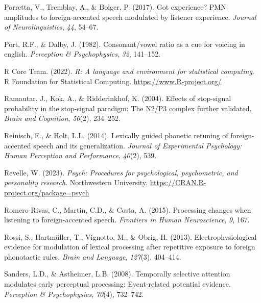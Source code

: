 \documentclass[
  12pt,
  twoside]{article}
\newlength{\cslhangindent}
\newlength{\cslentryspacingunit} %
\newenvironment{CSLReferences}[2] %
 {%
  \setlength{\parindent}{0pt}
  \ifodd #1
  \let\oldpar\par
  \def\par{\hangindent=\cslhangindent\oldpar}
  \fi
  \setlength{\parskip}{#2\cslentryspacingunit}
 }%
 {}
\begin{document}
\begin{CSLReferences}{1}{0}
\leavevmode{}%
Porretta, V., Tremblay, A., \& Bolger, P. (2017). Got experience? PMN amplitudes to foreign-accented speech modulated by listener experience. \emph{Journal of Neurolinguistics}, \emph{44}, 54--67.

\leavevmode{}%
Port, R.F., \& Dalby, J. (1982). Consonant/vowel ratio as a cue for voicing in english. \emph{Perception \& Psychophysics}, \emph{32}, 141--152.

\leavevmode{}%
R Core Team. (2022). \emph{R: A language and environment for statistical computing}. R Foundation for Statistical Computing. \url{https://www.R-project.org/}

\leavevmode{}%
Ramautar, J., Kok, A., \& Ridderinkhof, K. (2004). Effects of stop-signal probability in the stop-signal paradigm: The {N2/P3} complex further validated. \emph{Brain and Cognition}, \emph{56}(2), 234--252.

\leavevmode{}%
Reinisch, E., \& Holt, L.L. (2014). Lexically guided phonetic retuning of foreign-accented speech and its generalization. \emph{Journal of Experimental Psychology: Human Perception and Performance}, \emph{40}(2), 539.

\leavevmode{}%
Revelle, W. (2023). \emph{Psych: Procedures for psychological, psychometric, and personality research}. Northwestern University. \url{https://CRAN.R-project.org/package=psych}

\leavevmode{}%
Romero-Rivas, C., Martin, C.D., \& Costa, A. (2015). Processing changes when listening to foreign-accented speech. \emph{Frontiers in Human Neuroscience}, \emph{9}, 167.

\leavevmode{}%
Rossi, S., Hartmüller, T., Vignotto, M., \& Obrig, H. (2013). Electrophysiological evidence for modulation of lexical processing after repetitive exposure to foreign phonotactic rules. \emph{Brain and Language}, \emph{127}(3), 404--414.

\leavevmode{}%
Sanders, L.D., \& Astheimer, L.B. (2008). Temporally selective attention modulates early perceptual processing: Event-related potential evidence. \emph{Perception \& Psychophysics}, \emph{70}(4), 732--742.


\end{CSLReferences}
\end{document}
